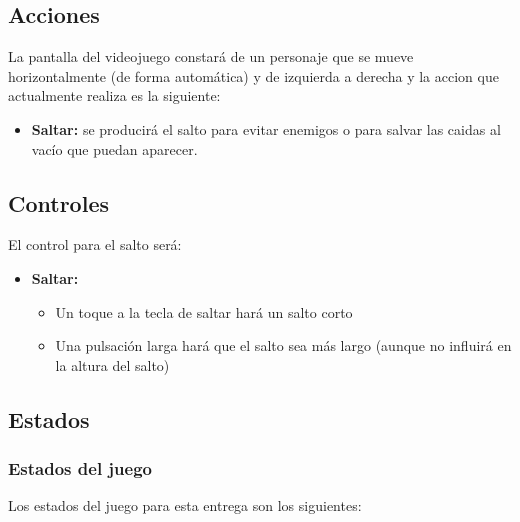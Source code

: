 \documentclass[palatino]{apuntes}
\begin{document}
\subsection{Acciones}
La pantalla del videojuego constará de un personaje que se mueve horizontalmente (de forma automática) y de izquierda a derecha y la accion que actualmente realiza es la siguiente:

\begin{itemize}
    \item \textbf{Saltar:} se producirá el salto para evitar enemigos o para salvar las caidas al vacío que puedan aparecer.
\end{itemize}


\subsection{Controles}
El control para el salto será:

\begin{itemize}
    \item \textbf{Saltar:}
        \begin{itemize}
            \item Un toque a la tecla de saltar hará un salto corto
            \item Una pulsación larga hará que el salto sea más largo (aunque no influirá en la altura del salto) 
        \end{itemize}
    
\end{itemize}


\subsection{Estados}

\subsubsection{Estados del juego}
Los estados del juego para esta entrega son los siguientes:
\end{document}
